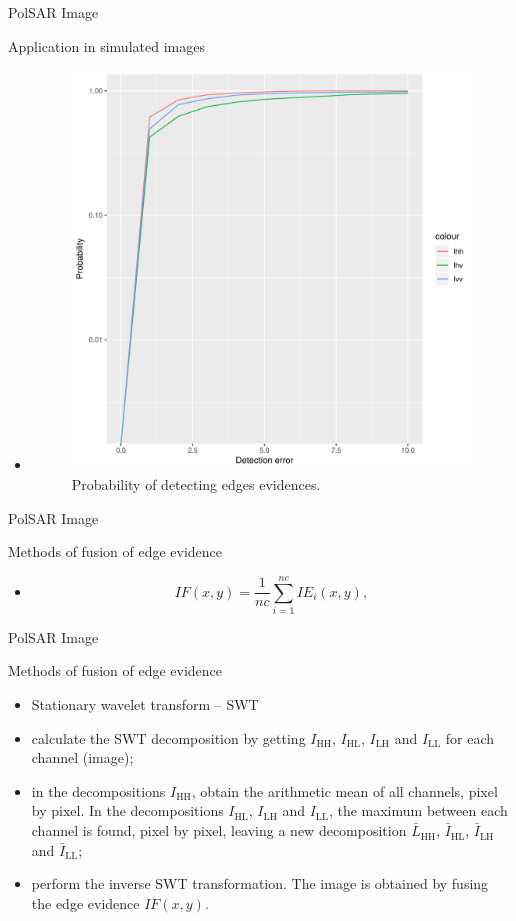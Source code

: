 \documentclass[10pt]{beamer}
\begin{document}
\begin{frame}[fragile]{PolSAR Image}
\begin{alertblock}{Application in simulated images}
\begin{itemize}
	\item 
	\begin{figure}[hbt]
	\centering
	\includegraphics[width=.5\linewidth]{metricas_ihh_ivh_ivv_nhfc_artigos}%
	\caption{Probability of detecting edges evidences.}
\label{probability_edge_detc}
\end{figure}
\end{itemize}
\end{alertblock}
\end{frame}


\begin{frame}[fragile]{PolSAR Image}
\begin{alertblock}{Methods of fusion of edge evidence}
\begin{itemize}
	\item 
	\begin{equation}
	IF(x,y)=\frac{1}{nc}\sum_{i=1}^{nc}IE_i(x,y),
\end{equation} 	
\end{itemize}
\end{alertblock}
\end{frame}


\begin{frame}[fragile]{PolSAR Image}
\begin{alertblock}{Methods of fusion of edge evidence}
\begin{itemize}
	\item Stationary wavelet transform -- SWT
\item  calculate the SWT decomposition by getting $I_\text{HH}$, $I_\text{HL}$, $I_\text{LH}$ and $I_\text{LL}$ for each channel (image);
\item  in the decompositions $I_\text{HH}$, obtain the arithmetic mean of all channels, pixel by pixel. In the decompositions $I_\text{HL}$, $I_\text{LH}$ and $I_\text{LL}$, the maximum between each channel is found, pixel by pixel, leaving a new decomposition $\bar{L}_\text{HH}$, $\bar{I}_\text{HL}$, $\bar{I}_\text{LH}$ and $\bar{I}_\text{LL}$;
\item  perform the inverse SWT transformation. The image is obtained by fusing the edge evidence $IF(x,y)$.  
\end{itemize}
\end{alertblock}
\end{frame}
\end{document}
